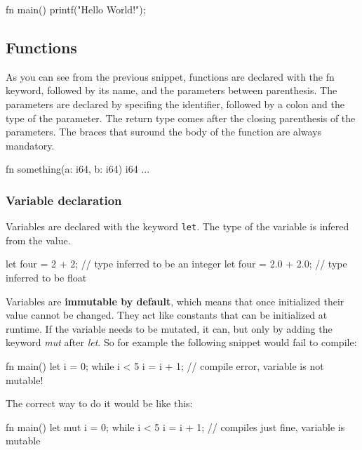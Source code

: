 ﻿\documentclass[10pt,a4paper,twocolumn,twoside]{article}
\begin{document}
\begin{code}
fn main() {
    printf("Hello World!\n");
}
\end{code}

\subsection{Functions}
As you can see from the previous snippet, functions are declared with the fn
keyword, followed by its name, and  the parameters between parenthesis. The
parameters are declared by specifing the identifier, followed by a colon and the
type of the parameter. The return type comes after the closing parenthesis of
the parameters. The braces that suround the body of the function are always
mandatory.

\begin{code}
    fn something(a: i64, b: i64) i64 { ... }
\end{code}

\subsubsection{Variable declaration}
Variables are declared with the keyword \texttt{let}. The type of the variable
is infered from the value.

\begin{code}
let four = 2 + 2; // type inferred to be an integer
let four = 2.0 + 2.0; // type inferred to be float
\end{code}

Variables are \textbf{immutable by default}, which means that once initialized
their value cannot be changed. They act like constants that can be initialized
at runtime. If the variable needs to be mutated, it can, but only by adding the
keyword \textit{mut} after \textit{let}. So for example the following snippet
would fail to compile:

\begin{code}
    fn main() {
        let i = 0;
        while i < 5 {
            i = i + 1; // compile error, variable is not mutable!
        }
    }
\end{code}

The correct way to do it would be like this:

\begin{code}
    fn main() {
        let mut i = 0;
        while i < 5 {
            i = i + 1; // compiles just fine, variable is mutable
        }
    }
\end{code}
\end{document}
